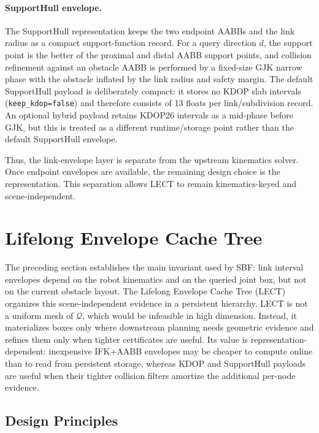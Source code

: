 \documentclass[journal]{IEEEtran}
\DeclareRobustCommand{\textsc}[1]{\textnormal{\MakeUppercase{#1}}}
\newcommand{\sbf}{\textsc{SBF}}
\newcommand{\Q}{\ensuremath{\mathcal{Q}}}
\begin{document}
\paragraph{SupportHull envelope.}
The SupportHull representation keeps the two endpoint AABBs and the link
radius as a compact support-function record. For a query direction $d$, the
support point is the better of the proximal and distal AABB support points,
and collision refinement against an obstacle AABB is performed by a fixed-size
GJK narrow phase with the obstacle inflated by the link radius and safety
margin. The default SupportHull payload is deliberately compact: it stores no
KDOP slab intervals (\texttt{keep\_kdop=false}) and therefore consists of 13
floats per link/subdivision record. An optional hybrid payload retains KDOP26
intervals as a mid-phase before GJK, but this is treated as a different
runtime/storage point rather than the default SupportHull envelope.

Thus, the link-envelope layer is separate from the upstream kinematics solver.
Once endpoint envelopes are available, the remaining design choice is the
representation. This separation allows LECT to remain kinematics-keyed and
scene-independent.

\section{Lifelong Envelope Cache Tree}\label{sec:lect}

The preceding section establishes the main invariant used by \sbf{}: link
interval envelopes depend on the robot kinematics and on the queried joint
box, but not on the current obstacle layout. The Lifelong Envelope Cache Tree
(LECT) organizes this scene-independent evidence in a persistent hierarchy.
LECT is not a uniform mesh of $\Q$, which would be infeasible in high dimension.
Instead, it materializes boxes only where downstream planning needs geometric
evidence and refines them only when tighter certificates are useful. Its value
is representation-dependent: inexpensive IFK+AABB envelopes may be cheaper to
compute online than to read from persistent storage, whereas KDOP and
SupportHull payloads are useful when their tighter collision filters amortize
the additional per-node evidence.

\subsection{Design Principles}\label{sec:lect_design}
\end{document}
